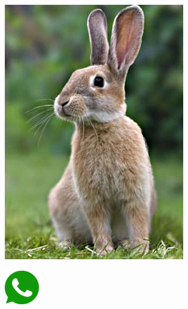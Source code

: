 \begin{multicols}{3}
			\begin{center}
				\includegraphics[height=.5\textheight]{./IMG-GIT/coelhinho.jpeg}
			\end{center}
			\begin{flushright}
				\includegraphics[height=15mm]{./IMG-GIT/whatsapp.png}
			\end{flushright}
			
			\vfill	
			\columnbreak
			

\end{multicols}

